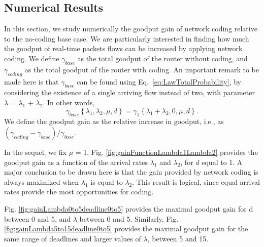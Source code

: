 \documentclass[preprint,12pt]{elsarticle}
\theoremstyle{definition}
\theoremstyle{plain}
\theoremstyle{remark}
\begin{document}
\subsection{Numerical Results} \label{section:numerical-results-coding}
In this section, we study numerically the goodput gain of network coding relative to the no-coding base case. We are particularly interested in finding how much the goodput of real-time packets flows can be increased by applying network coding. We define $\gamma_{base}$ as the total goodput of the router without coding, and $\gamma_{coding}$ as the total goodput of the router with coding. An important remark to be made here is that $\gamma_{base}$ can be found using Eq.~\eqref{eq:LawTotalProbability}, by considering the existence of a single arriving flow instead of two, with parameter $\lambda$ = $\lambda_{1}$ + $\lambda_{2}$. In other words,
 \begin{equation} \label{eq:base case}
  \gamma_{base}\left\{\lambda_{1},\lambda_{2}, \mu, d\right\} = \gamma_{1}\left\{\lambda_{1} + \lambda_{2},0, \mu, d\right\}.
    \end{equation}
We define the goodput gain as the relative increase in goodput, i.e., as $(\gamma_{coding}-\gamma_{base})/\gamma_{base}$.

In the sequel, we fix $\mu$ = 1. Fig. \ref{fig:gainFunctionLambda1Lambda2} provides the goodput gain as a function of the arrival rates $\lambda_{1}$ and $\lambda_{2}$, for $d$ equal to 1. A major conclusion to be drawn here is that the gain provided by network coding is always maximized when $\lambda_{1}$ is equal to $\lambda_{2}$. This result is logical, since equal arrival rates provide the most opportunities for coding.

Fig. \ref{fig:gainLambda0to5deadline0to5} provides the maximal goodput gain for d between 0 and 5, and
$\lambda$ between 0 and 5. Similarly, Fig. \ref{fig:gainLambda5to15deadline0to5} provides the maximal goodput gain for the same range of deadlines and larger values of  $\lambda$, between 5 and 15.
\end{document}
